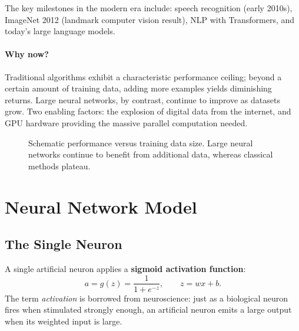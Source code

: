 The key milestones in the modern era include: speech recognition (early 2010s),
ImageNet 2012 (landmark computer vision result), NLP with Transformers, and
today's large language models.

\paragraph{Why now?}
Traditional algorithms exhibit a characteristic performance ceiling; beyond a
certain amount of training data, adding more examples yields diminishing
returns. Large neural networks, by contrast, continue to improve as datasets
grow. Two enabling factors: the explosion of digital data from the internet,
and GPU hardware providing the massive parallel computation needed.

\begin{figure}[h]
\centering
{}
\caption{Schematic performance versus training data size. Large neural networks
continue to benefit from additional data, whereas classical methods plateau.}
\label{fig:scaling}
\end{figure}

\section{Neural Network Model}

\subsection{The Single Neuron}

A single artificial neuron applies a \textbf{sigmoid activation function}:
\begin{equation}
a=g(z)=\frac{1}{1+e^{-z}},\qquad z=wx+b.
\label{eq:single-neuron}
\end{equation}
The term \emph{activation} is borrowed from neuroscience: just as a biological
neuron fires when stimulated strongly enough, an artificial neuron emits a
large output when its weighted input is large.

